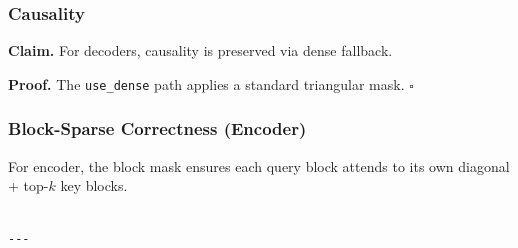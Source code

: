 \subsubsection{Causality}

\textbf{Claim.} For decoders, causality is preserved via dense fallback.

\textbf{Proof.} The \texttt{use\_dense} path applies a standard triangular mask. $\square$

\subsubsection{Block-Sparse Correctness (Encoder)}

For encoder, the block mask ensures each query block attends to its own 
diagonal + top-$k$ key blocks.
\begin{lstlisting}

---
\end{lstlisting}